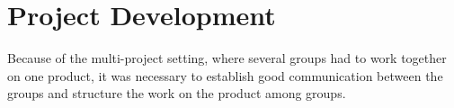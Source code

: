 \chapter{Project Development} %
Because of the multi-project setting, where several groups had to work together on one product, it was necessary to establish good communication between the groups and structure the work on the product among groups. 
